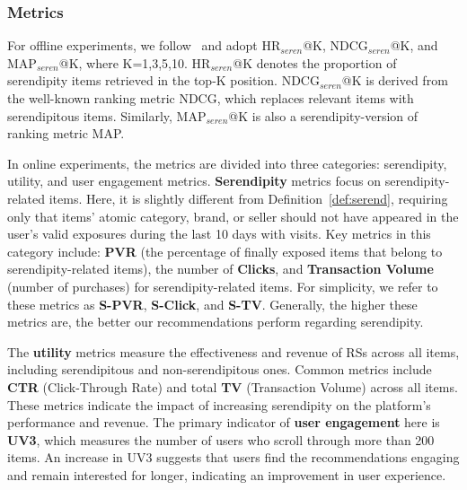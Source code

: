 \subsubsection{Metrics}\label{sec:metrics} For offline experiments, we follow~\cite{fu2023wisdom,fu2024art} and adopt HR$_{seren}$@K, NDCG$_{seren}$@K, and MAP$_{seren}$@K, where K=1,3,5,10. HR$_{seren}$@K denotes the proportion of serendipity items retrieved in the top-K position. NDCG$_{seren}$@K is derived from the well-known ranking metric NDCG, which replaces relevant items with serendipitous items. Similarly, MAP$_{seren}$@K is also a serendipity-version of ranking metric MAP. 

In online experiments, the metrics are divided into three categories: serendipity, utility, and user engagement metrics. \textbf{Serendipity} metrics focus on serendipity-related items. Here, it is slightly different from Definition~\ref{def:serend}, requiring only that items' atomic category, brand, or seller should not have appeared in the user's valid exposures during the last 10 days with visits. Key metrics in this category include:  \textbf{PVR} (the percentage of finally exposed items that belong to serendipity-related items), the number of \textbf{Clicks}, and \textbf{Transaction Volume} (number of purchases) for serendipity-related items. For simplicity, we refer to these metrics as \textbf{S-PVR}, \textbf{S-Click}, and \textbf{S-TV}. Generally, the higher these metrics are, the better our recommendations perform regarding serendipity.

The \textbf{utility} metrics measure the effectiveness and revenue of RSs across all items, including serendipitous and non-serendipitous ones. Common metrics include \textbf{CTR} (Click-Through Rate) and total \textbf{TV} (Transaction Volume) across all items. These metrics indicate the impact of increasing serendipity on the platform's performance and revenue.  The primary indicator of \textbf{user engagement} here is \textbf{UV3}, which measures the number of users who scroll through more than 200 items. An increase in UV3 suggests that users find the recommendations engaging and remain interested for longer, indicating an improvement in user experience.


